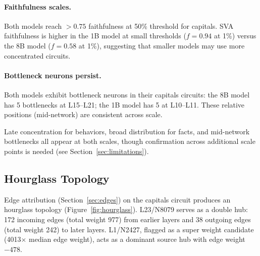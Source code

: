\documentclass[11pt]{article}
\begin{document}
\paragraph{Faithfulness scales.}
Both models reach $> 0.75$ faithfulness at 50\% threshold for capitals.
SVA faithfulness is higher in the 1B model at small thresholds ($f{=}0.94$ at 1\%) versus the 8B model ($f{=}0.58$ at 1\%), suggesting that smaller models may use more concentrated circuits.

\paragraph{Bottleneck neurons persist.}
Both models exhibit bottleneck neurons in their capitals circuits: the 8B model has 5 bottlenecks at L15--L21; the 1B model has 5 at L10--L11.
These relative positions (mid-network) are consistent across scale.

Late concentration for behaviors, broad distribution for facts, and mid-network bottlenecks all appear at both scales, though confirmation across additional scale points is needed (see Section~\ref{sec:limitations}).


\subsection{Hourglass Topology}
\label{sec:hourglass}

Edge attribution (Section~\ref{sec:edges}) on the capitals circuit produces an hourglass topology (Figure~\ref{fig:hourglass}).
L23/N8079 serves as a double hub: 172 incoming edges (total weight 977) from earlier layers and 38 outgoing edges (total weight 242) to later layers.
L1/N2427, flagged as a super weight candidate~\citep{yu2024superweights} (4013$\times$ median edge weight), acts as a dominant source hub with edge weight $-478$.
\end{document}
